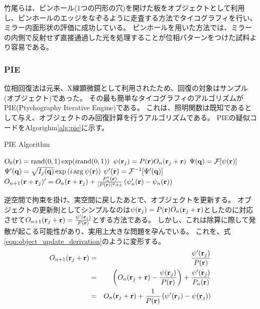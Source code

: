 竹尾らは、ピンホール(1つの円形の穴)を開けた板をオブジェクトとして利用し、ピンホールのエッジをなぞるように走査する方法でタイコグラフィを行い、ミラー内面形状の評価に成功している。
ピンホールを用いた方法では、ミラーの内側で反射せず直接通過した光を処理することが位相パターンをつけた試料より容易である。

\subsubsection{PIE}
位相回復法は元来、X線顕微鏡として利用されたため、回復の対象はサンプル(オブジェクト)であった。
その最も簡単なタイコグラフィのアルゴリズムがPIE(Ptychography Iterative Engine)である。
これは、照明関数は既知であるとして与え、オブジェクトのみ回復計算を行うアルゴリズムである。
PIEの疑似コードをAlgorighm\ref{alg:pie}に示す。

\begin{algorithm}                      
\caption{PIE Algorithm}         
\label{alg:pie}                          
\begin{algorithmic}
    \STATE $O_0(\mathbf{r}) = \mathrm{rand}(0,1) \exp(i \mathrm{rand}(0,1) )$
        \STATE $\psi(\mathbf{r}_j) = P(\mathbf{r}) O_n(\mathbf{r}_j + \mathbf{r})$
        \STATE $\Psi(\mathbf{q}) = \mathcal F [\psi(\mathbf{r})]$
        \STATE $\Psi'(\mathbf{q}) = \sqrt{I_j(\mathbf{q})} \exp\left( i \arg \psi(\mathbf{r}) \right)$ 
        \STATE $\psi'(\mathbf{r}) = \mathcal F^{-1} [\Psi'(\mathbf{q})]$
        \STATE $O_{n+1}(\mathbf{r} + \mathbf{r}_j)'
          = O_n(\mathbf{r} + \mathbf{r}_j) 
          + \frac{P_n^*(\mathbf{r})}{|P(\mathbf{r})|^2+\varepsilon} \left( \psi_n'(\mathbf{r}) - \psi_n(\mathbf{r}) \right)$
      \ENDFOR
    \ENDFOR
\end{algorithmic}
\end{algorithm}

逆空間で拘束を掛け、実空間に戻したあとで、オブジェクトを更新する。
オブジェクトの更新則としてシンプルなのは$\psi(\mathbf{r}_j) = P(\mathbf{r}) O_n(\mathbf{r}_j + \mathbf{r})$としたのに対応させて$O_{n+1}(\mathbf{r}_j + \mathbf{r}) = \frac{\psi'(\mathbf{r}_j)}{P(\mathbf{r})}$とする方法である。
しかし、これは除算に際して発散が起こる可能性があり、実用上大きな問題を孕んでいる。
これを、式\ref{eqn:object_update_derivation}のように変形する。
\begin{eqnarray}
O_{n+1}(\mathbf{r}_j + \mathbf{r})
  &=& \frac{\psi'(\mathbf{r}_j)}{P(\mathbf{r})} \nonumber \\
  &=& \left( O_n(\mathbf{r}_j + \mathbf{r}) - \frac{\psi(\mathbf{r}_j)}{P(\mathbf{r})} \right) + \frac{\psi'(\mathbf{r}_j)}{P_n(\mathbf{r})} \nonumber \\
  &=& O_n(\mathbf{r}_j + \mathbf{r}) + \frac{1}{P(\mathbf{r})} \left( \psi'(\mathbf{r}_j) - \psi(\mathbf{r}_j) \right) \label{eqn:object_update_derivation}
\end{eqnarray}


